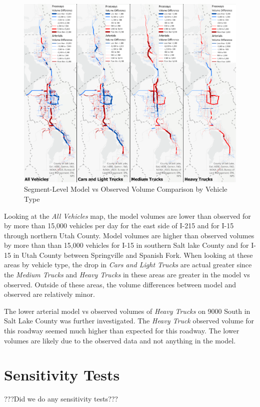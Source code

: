 \documentclass[
  letterpaper,
  DIV=11,
  numbers=noendperiod]{scrreprt}
\begin{document}
\begin{figure}[H]

{\centering \includegraphics{v9x/v900/validation/_pictures/7-plot6.png}

}

\caption{\label{fig-map}Segment-Level Model vs Observed Volume
Comparison by Vehicle Type}

\end{figure}

Looking at the \emph{All Vehicles} map, the model volumes are lower than
observed for by more than 15,000 vehicles per day for the east side of
I-215 and for I-15 through northern Utah County. Model volumes are
higher than observed volumes by more than than 15,000 vehicles for I-15
in southern Salt lake County and for I-15 in Utah County between
Springville and Spanish Fork. When looking at these areas by vehicle
type, the drop in \emph{Cars and Light Trucks} are actual greater since
the \emph{Medium Trucks} and \emph{Heavy Trucks} in these areas are
greater in the model vs observed. Outside of these areas, the volume
differences between model and observed are relatively minor.

The lower arterial model vs observed volumes of \emph{Heavy Trucks} on
9000 South in Salt Lake County was further investigated. The \emph{Heavy
Truck} observed volume for this roadway seemed much higher than expected
for this roadway. The lower volumes are likely due to the observed data
and not anything in the model.


\hypertarget{sensitivity-tests}{%
\chapter{Sensitivity Tests}\label{sensitivity-tests}}

???Did we do any sensitivity tests???
\end{document}

